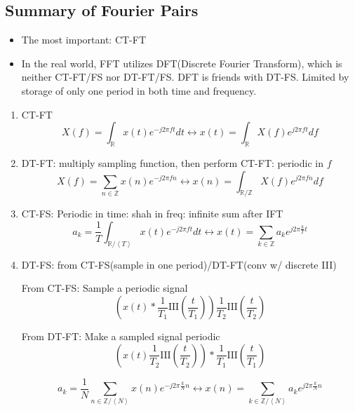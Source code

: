 \documentclass{article}
\begin{document}
\subsection{Summary of Fourier Pairs}
\begin{itemize}
    \item The most important: CT-FT
    \item In the real world, FFT utilizes DFT(Discrete Fourier Transform), which is neither CT-FT/FS nor DT-FT/FS. DFT is friends with DT-FS. Limited by storage of only one period in both time and frequency.
\end{itemize}
\begin{enumerate}
    \item CT-FT
    \[X(f)=\int_{\mathbb{R}}{x(t)e^{-j2\pi ft}dt}\leftrightarrow x(t)=\int_{\mathbb{R}}{X(f)e^{j2\pi ft}df}\]
    \item DT-FT: multiply sampling function, then perform CT-FT: periodic in $f$
    \[X(f)=\sum_{n\in\mathbb{Z}}{x(n)e^{-j2\pi fn}}\leftrightarrow x(n)=\int_{\mathbb{R}/\mathbb{Z}}X(f)e^{j2\pi fn}df\]
    \item CT-FS: Periodic in time: shah in freq: infinite sum after IFT
    \[a_k=\frac{1}{T}\int_{\mathbb{R}/\left<T\right>}{x(t)e^{-j2\pi ft}dt}\leftrightarrow x(t)=\sum_{k\in\mathbb{Z}}{a_ke^{j2\pi\frac{k}{T}t}}\]
    \item DT-FS: from CT-FS(sample in one period)/DT-FT(conv w/ discrete III)
    
    From CT-FS: Sample a periodic signal
    \[\left(x(t)*\frac{1}{T_1}\mathrm{III}\left(\frac{t}{T_1}\right)\right)\frac{1}{T_2}\mathrm{III}\left(\frac{t}{T_2}\right)\]
    
    From DT-FT: Make a sampled signal periodic
    \[\left(x(t)\frac{1}{T_2}\mathrm{III}\left(\frac{t}{T_2}\right)\right)*\frac{1}{T_1}\mathrm{III}\left(\frac{t}{T_1}\right)\]
    
    \[a_k=\frac{1}{N}\sum_{n\in\mathbb{Z}/\left<N\right>}{x(n)e^{-j2\pi\frac{k}{N}n}}\leftrightarrow x(n)=\sum_{k\in\mathbb{Z}/\left<N\right>}a_ke^{j2\pi \frac{k}{N}n}
    \]
\end{enumerate}
\end{document}
